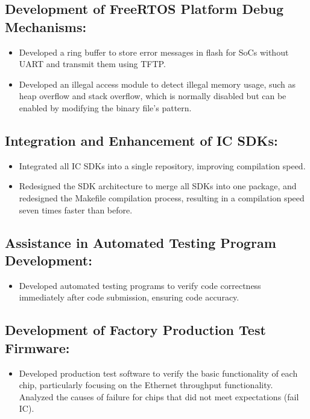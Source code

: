 \documentclass{article}
\begin{document}
\subsection*{Development of FreeRTOS Platform Debug Mechanisms:}
\begin{itemize}[label=$-$]
    \item Developed a ring buffer to store error messages in flash for SoCs without UART and transmit them using TFTP.
    \item Developed an illegal access module to detect illegal memory usage, such as heap overflow and stack overflow, which is normally disabled but can be enabled by modifying the binary file's pattern.
\end{itemize}

\subsection*{Integration and Enhancement of IC SDKs:}
\begin{itemize}[label=$-$]
    \item Integrated all IC SDKs into a single repository, improving compilation speed.
    \item Redesigned the SDK architecture to merge all SDKs into one package, and redesigned the Makefile compilation process, resulting in a compilation speed seven times faster than before.
\end{itemize}

\subsection*{Assistance in Automated Testing Program Development:}
\begin{itemize}[label=$-$]
    \item Developed automated testing programs to verify code correctness immediately after code submission, ensuring code accuracy.
\end{itemize}

\subsection*{Development of Factory Production Test Firmware:}
\begin{itemize}[label=$-$]
    \item Developed production test software to verify the basic functionality of each chip, particularly focusing on the Ethernet throughput functionality. Analyzed the causes of failure for chips that did not meet expectations (fail IC).
\end{itemize}
\end{document}
